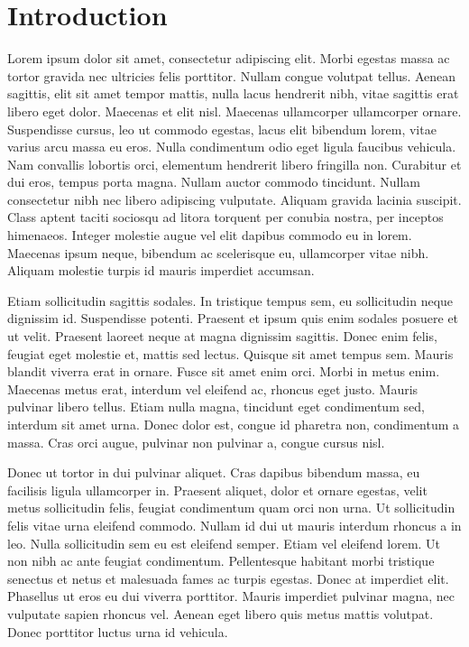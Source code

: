 \section{Introduction}

Lorem ipsum dolor sit amet, consectetur adipiscing elit. 
Morbi egestas massa ac tortor gravida nec ultricies felis porttitor. 
Nullam congue volutpat tellus. 
Aenean sagittis, elit sit amet tempor mattis, nulla lacus hendrerit nibh, vitae sagittis erat libero eget dolor.
Maecenas et elit nisl. 
Maecenas ullamcorper ullamcorper ornare. 
Suspendisse cursus, leo ut commodo egestas, lacus elit bibendum lorem, vitae varius arcu massa eu eros. 
Nulla condimentum odio eget ligula faucibus vehicula. 
Nam convallis lobortis orci, elementum hendrerit libero fringilla non. 
Curabitur et dui eros, tempus porta magna. 
Nullam auctor commodo tincidunt. Nullam consectetur nibh nec libero adipiscing vulputate. 
Aliquam gravida lacinia suscipit. 
Class aptent taciti sociosqu ad litora torquent per conubia nostra, per inceptos himenaeos. 
Integer molestie augue vel elit dapibus commodo eu in lorem. Maecenas ipsum neque, bibendum ac scelerisque eu, ullamcorper vitae nibh. 
Aliquam molestie turpis id mauris imperdiet accumsan.

Etiam sollicitudin sagittis sodales. In tristique tempus sem, eu sollicitudin neque dignissim id. Suspendisse potenti. Praesent et ipsum quis enim sodales posuere et ut velit. Praesent laoreet neque at magna dignissim sagittis. Donec enim felis, feugiat eget molestie et, mattis sed lectus. Quisque sit amet tempus sem. Mauris blandit viverra erat in ornare. Fusce sit amet enim orci. Morbi in metus enim. Maecenas metus erat, interdum vel eleifend ac, rhoncus eget justo. Mauris pulvinar libero tellus. Etiam nulla magna, tincidunt eget condimentum sed, interdum sit amet urna. Donec dolor est, congue id pharetra non, condimentum a massa. Cras orci augue, pulvinar non pulvinar a, congue cursus nisl.

Donec ut tortor in dui pulvinar aliquet. Cras dapibus bibendum massa, eu facilisis ligula ullamcorper in. Praesent aliquet, dolor et ornare egestas, velit metus sollicitudin felis, feugiat condimentum quam orci non urna. Ut sollicitudin felis vitae urna eleifend commodo. Nullam id dui ut mauris interdum rhoncus a in leo. Nulla sollicitudin sem eu est eleifend semper. Etiam vel eleifend lorem. Ut non nibh ac ante feugiat condimentum. Pellentesque habitant morbi tristique senectus et netus et malesuada fames ac turpis egestas. Donec at imperdiet elit. Phasellus ut eros eu dui viverra porttitor. Mauris imperdiet pulvinar magna, nec vulputate sapien rhoncus vel. Aenean eget libero quis metus mattis volutpat. Donec porttitor luctus urna id vehicula. 

